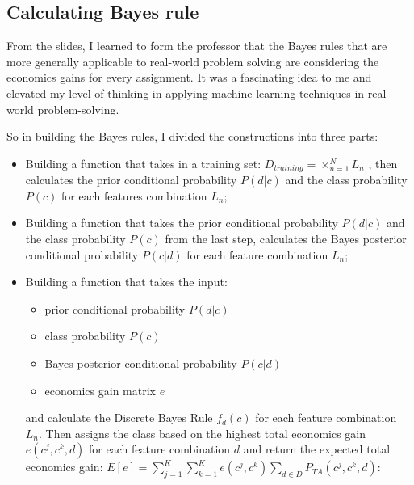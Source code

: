 \documentclass{article}
\begin{document}
\begin{multicols}{2}
        \subsection{Calculating Bayes rule}
        From the slides, I learned to form the professor that the Bayes rules that are more generally applicable to real-world problem solving are considering the economics gains for every assignment. It was a fascinating idea to me and elevated my level of thinking in applying machine learning techniques in real-world problem-solving. 

        So in building the Bayes rules, I divided the constructions into three parts: 
        \begin{itemize}
        \item Building a function that takes in a training set: $D_{training} = \times_{n=1}^{N}L_n$ , then calculates the prior conditional probability $P(d|c)$ and the class probability $P(c)$ for each features combination $L_n$;
        \item Building a function that takes the prior conditional probability $P(d|c)$ and the class probability $P(c)$ from the last step, calculates the Bayes posterior conditional probability $P(c|d)$ for each feature combination $L_n$;
        \item Building a function that takes the input:
            \begin{itemize}
                \item prior conditional probability $P(d|c)$
                \item class probability $P(c)$
                \item Bayes posterior conditional probability $P(c|d)$
                \item economics gain matrix $e$
            \end{itemize} 
            and calculate the Discrete Bayes Rule $f_d(c)$ for each feature combination $L_n$. Then assigns the class based on the highest total economics gain $e(c^j, c^k, d)$ for each feature combination $d$ and return the expected total economics gain:
            $E[e] = \sum_{j=1}^K\sum_{k=1}^K e(c^j, c^k) \sum_{d\in{D}}P_{TA}(c^j, c^k, d)$:
        \end{itemize}


\end{multicols}
\end{document}
